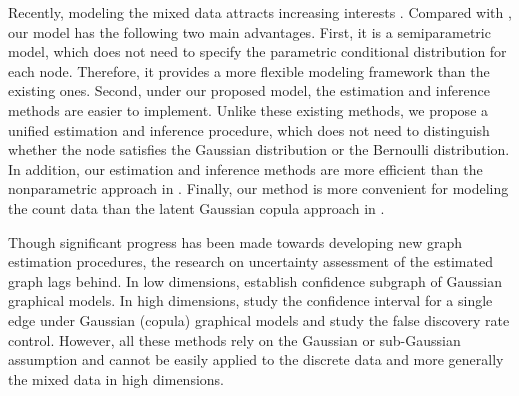 \documentclass[twoside,11pt]{article}
\begin{document}
Recently, modeling the mixed data attracts increasing interests  \citep{lee2013structure,fellinghauer2013stable, cheng2013high,chen2013selection,fan2014high,yang2014mixed}. Compared with \cite{lee2013structure, cheng2013high,chen2013selection,yang2014mixed}, our model has the following two main advantages. First, it is a semiparametric model, which does not need to specify the parametric conditional distribution for each node. Therefore, it provides a more flexible modeling framework than the existing ones. Second, under our proposed model, the estimation and inference methods are easier to implement. Unlike these existing methods, we propose a unified estimation and inference procedure, which does not need to distinguish whether the node satisfies the Gaussian distribution or the Bernoulli distribution. In addition, our estimation and inference methods are more efficient than the nonparametric approach in \cite{fellinghauer2013stable}. Finally, our method is more convenient for modeling the count data than the  latent Gaussian copula approach in \cite{fan2014high}.

Though significant progress has been made towards developing new graph estimation procedures, the research on uncertainty assessment of the estimated graph lags behind. In low dimensions, \cite{drton2007multiple,drton2008sinful} establish   confidence subgraph of Gaussian graphical models.
In high dimensions, \cite{ren2013asymptotic,jankova2014confidence,gu2015local} study the confidence interval for a single edge under Gaussian (copula) graphical models and \cite{liu2013gaussian} study the false discovery rate control.  %
However, all these methods rely on the Gaussian or sub-Gaussian assumption and cannot be easily applied to the discrete data and more generally the mixed data in high dimensions.
\end{document}
